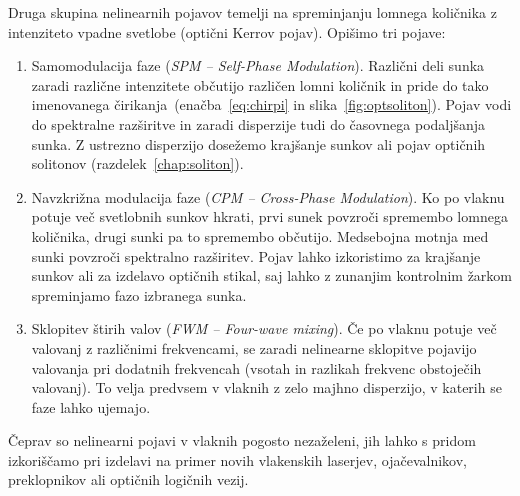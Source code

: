 Druga skupina nelinearnih pojavov temelji na spreminjanju 
lomnega količnika z intenziteto vpadne svetlobe (optični Kerrov pojav).
Opišimo tri pojave:
\begin{enumerate}
\item 
Samomodulacija faze ({\it SPM -- Self-Phase Modulation}). Različni deli
sunka zaradi različne intenzitete občutijo različen lomni količnik in pride
do tako imenovanega čirikanja~(enačba~\ref{eq:chirpi} 
in slika~\ref{fig:optsoliton}). 
Pojav vodi do spektralne razširitve in zaradi
disperzije tudi do časovnega podaljšanja sunka. Z ustrezno disperzijo dosežemo 
krajšanje sunkov ali pojav optičnih solitonov (razdelek~\ref{chap:soliton}).

\item
Navzkrižna modulacija faze ({\it CPM -- Cross-Phase Modulation}). Ko po vlaknu
potuje več svetlobnih sunkov hkrati, prvi sunek povzroči spremembo lomnega količnika, 
drugi sunki pa to spremembo občutijo. Medsebojna motnja med sunki povzroči 
spektralno razširitev. Pojav lahko izkoristimo za krajšanje sunkov ali
za izdelavo optičnih stikal, 
saj lahko z zunanjim kontrolnim žarkom spreminjamo fazo izbranega sunka.

\item
Sklopitev štirih valov ({\it FWM -- Four-wave mixing}). Če po vlaknu potuje več
valovanj z različnimi frekvencami, 
se zaradi nelinearne sklopitve pojavijo
valovanja pri dodatnih frekvencah (vsotah in razlikah frekvenc obstoječih valovanj). To velja
predvsem v vlaknih z zelo majhno disperzijo, v katerih se faze lahko ujemajo.  
\end{enumerate}

Čeprav so nelinearni pojavi v vlaknih pogosto nezaželeni, jih lahko s pridom
izkoriščamo pri izdelavi na primer novih vlakenskih laserjev, ojačevalnikov, preklopnikov ali 
optičnih logičnih vezij. 
